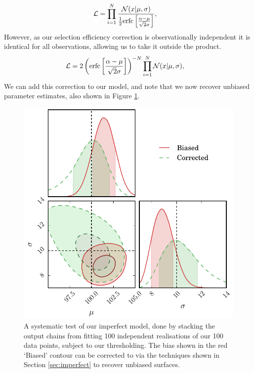\documentclass[a4paper,fleqn,usenatbib]{mnras}
\begin{document}
\begin{align}
\mathcal{L} &= \prod_{i=1}^N \frac{ \mathcal{N}(x|\mu, \sigma)}{\frac{1}{2} {\rm erfc}\left[ \frac{\alpha - \mu}{\sqrt{2}\sigma} \right]}, 
\end{align}
However, as our selection efficiency correction is observationally independent it is identical for all observations, allowing us to take it outside the product.
\begin{align}
\mathcal{L} &= 2 \left( {\rm erfc}\left[ \frac{\alpha - \mu}{\sqrt{2}\sigma} \right] \right)^{-N}\prod_{i=1}^N  \mathcal{N}(x|\mu, \sigma), 
\end{align}
We can add this correction to our model, and note that we now recover unbiased parameter estimates, also shown in Figure \ref{fig:imperfect}.
\begin{figure}
	\begin{center}
		\includegraphics[width=\columnwidth]{example/imperfect.pdf}
	\end{center}
	\caption{A systematic test of our imperfect model, done by stacking the output chains from fitting 100 independent realisations of our 100 data points, subject to our thresholding. The bias shown in the red `Biased' contour can be corrected to via the techniques shown in Section \ref{sec:imperfect} to recover unbiased surfaces.}
	\label{fig:imperfect}
\end{figure}
\end{document}

